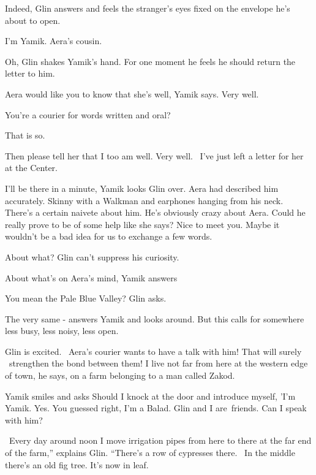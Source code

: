 \documentclass[12pt]{book}
\begin{document}
{\textquotedbl}Indeed,{\textquotedbl} Glin answers and feels the stranger's eyes fixed on the envelope he's about to
open.

{\textquotedbl}I'm Yamik. Aera's cousin.{\textquotedbl}

{\textquotedbl}Oh,{\textquotedbl} Glin shakes Yamik's hand. For one moment he feels he should return the letter to him.
~

{\textquotedbl}Aera would like you to know that she's well,{\textquotedbl} Yamik says. {\textquotedbl}Very
well.{\textquotedbl}

{\textquotedbl}You're a courier for words written and oral?{\textquotedbl}

{\textquotedbl}That is so.{\textquotedbl}

{\textquotedbl}Then please tell her that I too am well. Very well.~ I've just left a letter for her at the
Center.{\textquotedbl}

{\textquotedbl}I'll be there in a minute,{\textquotedbl} Yamik looks Glin over. Aera had described him accurately.
Skinny with a Walkman and earphones hanging from his neck. There's a certain naivete about him. He's obviously crazy
about Aera. Could he really prove to be of some help like she says? {\textquotedbl}Nice to meet you. Maybe it wouldn't
be a bad idea for us to exchange a few words.{\textquotedbl}

{\textquotedbl}About what?{\textquotedbl} Glin can't suppress his curiosity.

{\textquotedbl}About what's on Aera's mind,{\textquotedbl} Yamik answers

{\textquotedbl}You mean the Pale Blue Valley?{\textquotedbl} Glin asks.

{\textquotedbl}The very same -{\textquotedbl} answers Yamik and looks around. {\textquotedbl}But this calls for
somewhere less busy, less noisy, less open.{\textquotedbl}

Glin is excited. \ Aera's courier wants to have a talk with him! That will surely \ strengthen the bond between them!
{\textquotedbl}I live not far from here at the western edge of town,{\textquotedbl} he says, {\textquotedbl}on a farm
belonging to a man called Zakod.{\textquotedbl}

Yamik smiles and asks {\textquotedbl}Should I knock at the door and introduce myself, 'I'm Yamik. Yes. You guessed
right, I'm a Balad. Glin and I are~friends. Can I speak with him?{\textquotedbl}

\ {\textquotedbl}Every day around noon I move irrigation pipes from here to there at the far end of the farm,'' explains
Glin. ``There's a row of cypresses there. ~In the middle there's an old fig tree. It's now in leaf.{\textquotedbl}
\end{document}
